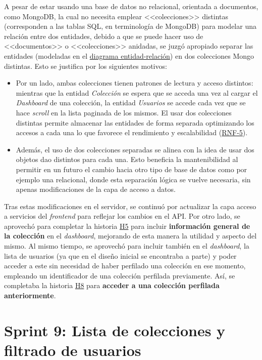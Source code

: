 A pesar de estar usando una base de datos no relacional, orientada a documentos, como MongoDB, la cual no necesita emplear <<colecciones>> distintas (corresponden a las tablas SQL, en terminología de MongoDB) para modelar una relación entre dos entidades, debido a que se puede hacer uso de <<documentos>> o <<colecciones>> anidadas, se juzgó apropiado separar las entidades (modeladas en el \hyperref[fig:diagrama/ER]{diagrama entidad-relación}) en dos colecciones Mongo distintas. Esto se justifica por los siguientes motivos: 

\begin{itemize}
    \item Por un lado, ambas colecciones tienen patrones de lectura y acceso distintos: mientras que la entidad \textit{Colección} se espera que se acceda una vez al cargar el \textit{Dashboard} de una colección, la entidad \textit{Usuarios} se accede cada vez que se hace \textit{scroll} en la lista paginada de los mismos. El usar dos colecciones distintas permite almacenar las entidades de forma separada optimizando los accesos a cada una lo que favorece el rendimiento y escalabilidad (\hyperref[tab:rnf]{RNF-5}).
    
    \item Además, el uso de dos colecciones separadas se alinea con la idea de usar dos objetos \acrshort{dao} distintos para cada una. Esto beneficia la mantenibilidad al permitir en un futuro el cambio hacia otro tipo de base de datos como por ejemplo una relacional, donde esta separación lógica se vuelve necesaria, sin apenas modificaciones de la capa de acceso a datos.
\end{itemize}

Tras estas modificaciones en el servidor, se continuó por actualizar la capa acceso a servicios del \textit{frontend} para reflejar los cambios en el API. Por otro lado, se aprovechó para completar la historia \hyperref[tab:user-stories]{H5} para incluir \textbf{información general de la colección} en el \textit{dashboard}, mejorando de esta manera la utilidad y aspecto del mismo. Al mismo tiempo, se aprovechó para incluir también en el \textit{dashboard}, la lista de usuarios (ya que en el diseño inicial se encontraba a parte) y poder acceder a este sin necesidad de haber perfilado una colección en ese momento, empleando un identificador de una colección perfilada previamente. Así, se completaba la historia \hyperref[tab:user-stories]{H8} para \textbf{acceder a una colección perfilada anteriormente}. 

\section{Sprint 9: Lista de colecciones y filtrado de usuarios}

